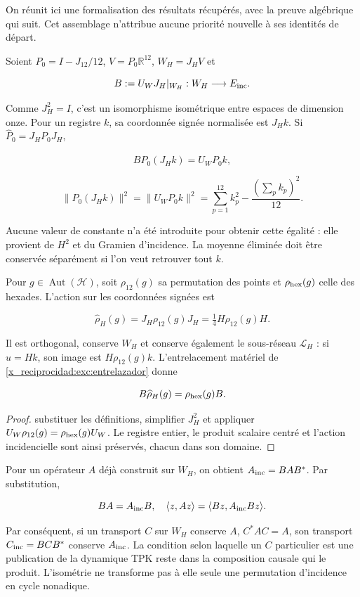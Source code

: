 On réunit ici une formalisation des résultats récupérés, avec la preuve algébrique qui suit. Cet assemblage n’attribue aucune priorité nouvelle à ses identités de départ.

Soient \(P_0=I-J_{12}/12\), \(V=P_0\mathbb R^{12}\), \(W_H=J_HV\) et

\[
B:=U_WJ_H|_{W_H}:W_H\longrightarrow E_{\rm inc}.
\]

Comme \(J_H^2=I\), c’est un isomorphisme isométrique entre espaces de dimension onze. Pour un registre \(k\), sa coordonnée signée normalisée est \(J_Hk\). Si \(\widehat P_0=J_HP_0J_H\),

\[
B\widehat P_0(J_Hk)=U_WP_0k,
\]

\[
\|\widehat P_0(J_Hk)\|^2
=\|U_WP_0k\|^2
=\sum_{p=1}^{12}k_p^2-\frac{(\sum_pk_p)^2}{12}.
\]

Aucune valeur de constante n’a été introduite pour obtenir cette égalité : elle provient de \(H^2\) et du Gramien d’incidence. La moyenne éliminée doit être conservée séparément si l’on veut retrouver tout \(k\).

Pour \(g\in\operatorname{Aut}(\mathcal H)\), soit \(\rho_{12}(g)\) sa permutation des points et \(\rho_{\rm hex}(g)\) celle des hexades. L’action sur les coordonnées signées est

\[
\widehat\rho_H(g)=J_H\rho_{12}(g)J_H
=\tfrac14H\rho_{12}(g)H.
\]

Il est orthogonal, conserve \(W_H\) et conserve également le sous-réseau \(\mathcal L_H\) : si \(u=Hk\), son image est \(H\rho_{12}(g)k\). L’entrelacement matériel de \cref{x_reciprocidad:exc:entrelazador} donne

\[
B\widehat\rho_H(g)=\rho_{\rm hex}(g)B.
\]

\begin{proof}
substituer les définitions, simplifier \(J_H^2\) et appliquer \(U_W\rho_{12}(g)=\rho_{\rm hex}(g)U_W\). Le registre entier, le produit scalaire centré et l’action incidencielle sont ainsi préservés, chacun dans son domaine.
\end{proof}

Pour un opérateur \(A\) déjà construit sur \(W_H\), on obtient \(A_{\rm inc}=BAB^*\). Par substitution,

\[
BA=A_{\rm inc}B,\quad
\langle z,Az\rangle=\langle Bz,A_{\rm inc}Bz\rangle.
\]

Par conséquent, si un transport \(C\) sur \(W_H\) conserve \(A\), \(C^*AC=A\), son transport \(C_{\rm inc}=BCB^*\) conserve \(A_{\rm inc}\). La condition selon laquelle un \(C\) particulier est une publication de la dynamique TPK reste dans la composition causale qui le produit. L’isométrie ne transforme pas à elle seule une permutation d’incidence en cycle nonadique.


